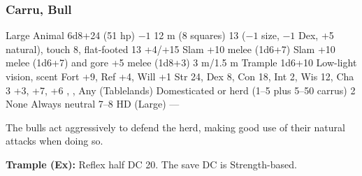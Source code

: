 \subsubsection{Carru, Bull}
\begin{MonsterStats}
{Large Animal}
{6d8+24 (51 hp)}
{$-1$}
{12 m (8 squares)}
{13 ($-1$ size, $-1$ Dex, +5 natural), touch 8, flat-footed 13}
{+4/+15}
{Slam +10 melee (1d6+7)}
{Slam +10 melee (1d6+7) and gore +5 melee (1d8+3)}
{3 m/1.5 m}
{Trample 1d6+10}
{Low-light vision, scent}
{Fort +9, Ref +4, Will +1}
{Str 24, Dex 8, Con 18, Int 2, Wis 12, Cha 3}
{ +3,  +7,  +6}
{, , }
{Any (Tablelands)}
{Domesticated or herd (1--5 plus 5--50 carrus)}
{2}
{None}
{Always neutral}
{7--8 HD (Large)}
{---}
\end{MonsterStats}


The bulls act aggressively to defend the herd, making good use of their natural attacks when doing so.

\textbf{Trample (Ex):} Reflex half DC 20. The save DC is Strength-based.
